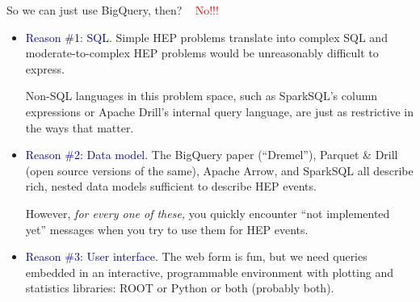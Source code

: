 \documentclass[aspectratio=169]{beamer}
\begin{document}
\begin{frame}{So we can just use BigQuery, then?}
\vspace{0.25 cm}
\mbox{ } \hfill \textcolor{red}{\Huge No!!!} \hfill \mbox{ }

\vspace{0.1 cm}
\begin{itemize}\setlength{\itemsep}{0.2 cm}
\item<2-> \textcolor{darkblue}{Reason \#1: SQL.} Simple HEP problems translate into complex SQL and moderate-to-complex HEP problems would be unreasonably difficult to express.

\vspace{0.15 cm}
Non-SQL languages in this problem space, such as SparkSQL's column expressions or Apache Drill's internal query language, are just as restrictive in the ways that matter.

\item<3-> \textcolor{darkblue}{Reason \#2: Data model.} The BigQuery paper (``Dremel''), Parquet \& Drill (open source versions of the same), Apache Arrow, and SparkSQL all describe rich, nested data models sufficient to describe HEP events.

\vspace{0.15 cm}
However, {\it for every one of these,} you quickly encounter ``not implemented yet'' messages when you try to use them for HEP events.

\item<4-> \textcolor{darkblue}{Reason \#3: User interface.} The web form is fun, but we need queries embedded in an interactive, programmable environment with plotting and statistics libraries: ROOT or Python or both (probably both).
\end{itemize}
\end{frame}
\end{document}
